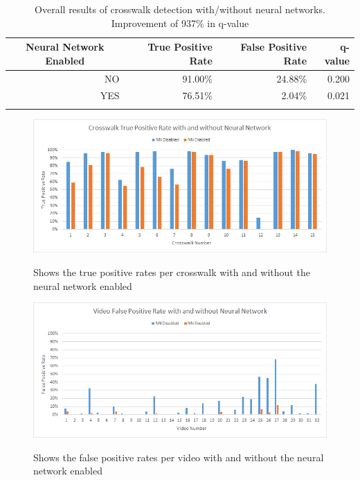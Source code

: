 \documentclass[12pt]{ucthesis}
\newcommand{\captionfonts}{\small\bf\ssp}
\begin{document}
\begin{table}[t]
    \begin{longtable}{|r|r|r|r|}
    \hline
    \multicolumn{1}{|c|}{Neural Network Enabled} & True Positive Rate & False Positive Rate & q-value \bigstrut\\
    \hline
    NO    & 91.00\% & 24.88\% & 0.200 \bigstrut\\
    \hline
    YES   & 76.51\% & 2.04\% & 0.021 \bigstrut\\
    \hline



    \caption[Overall results of crosswalk detection with and without neural networks]{Overall results of crosswalk detection with/without neural networks. Improvement of 937\% in q-value}
    \label{tab:overallresults} 
    \end{longtable}
\end{table}

\begin{figure}[t]
\begin{center}
\includegraphics[width=14cm]{CrosswalkTruePosWithAndWithout.png}
\captionfonts
\caption[Crosswalk True Positive Rate with and without Neural Network]{Shows the true positive rates per crosswalk with and without the neural network enabled}
\label{fig:CrosswalkTruePosWithAndWithout}
\end{center}
\end{figure}

\begin{figure}[t]
\begin{center}
\includegraphics[width=14cm]{VideoFalsePosWithAndWithout.png}
\captionfonts
\caption[Video False Positive Rate with and without Neural Network]{Shows the false positive rates per video with and without the neural network enabled}
\label{fig:VideoFalsePosWithAndWithout}
\end{center}
\end{figure}
\end{document}
